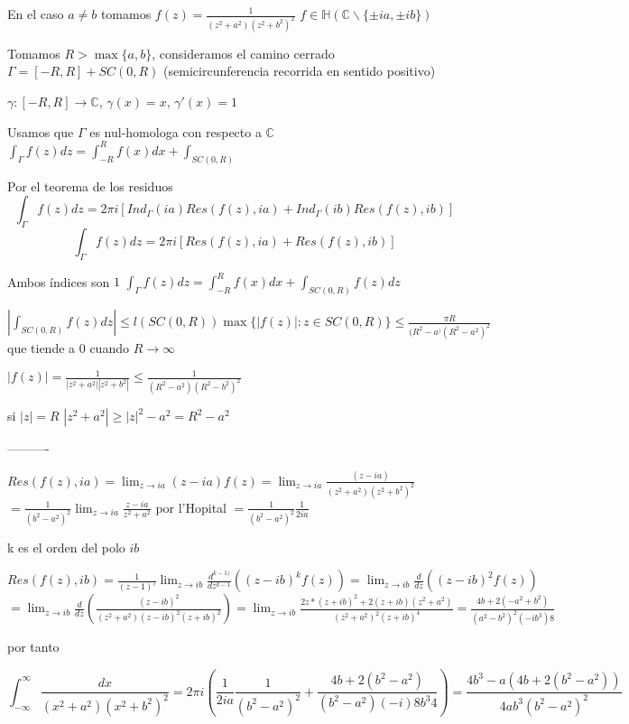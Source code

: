 
En el caso $a\not = b$ tomamos $f(z) = \frac{1}{(z^2+a^2)(z^2+b^2)^2}$
$f\in\mathbb{H}( \mathbb{C}\backslash\{ \pm ia, \pm ib \} )$

Tomamos $R>\max\{a,b\}$, consideramos el camino cerrado $\Gamma = [-R,R]+SC(0,R)$ (semicircunferencia recorrida en sentido positivo)

$\gamma : [-R,R]\rightarrow \mathbb{C}$, $\gamma(x)=x$, $\gamma '(x) = 1$

Usamos que $\Gamma$ es nul-homologa con respecto a $\mathbb{C}$
$\int_{\Gamma}f(z)dz = \int_{-R}^{R} f(x)dx + \int_{SC(0,R)}$

Por el teorema de los residuos 
$$\int_{\Gamma}f(z)dz = 2\pi i [ Ind_{\Gamma}(ia)Res(f(z),ia) + Ind_{\Gamma}(ib)Res(f(z),ib) ]$$
$$\int_{\Gamma}f(z)dz = 2\pi i [Res(f(z),ia) + Res(f(z),ib) ]$$

Ambos índices son $1$
$\int_{\Gamma}f(z)dz = \int_{-R}^{R} f(x)dx + \int_{SC(0,R)} f(z)dz$


$|\int_{SC(0,R)} f(z)dz| \leq l(SC(0,R))\max \{ |f(z)| : z\in SC(0,R) \} \leq \frac{\pi R}{(R^2-a^)(R^2-a^2)^2}$
que tiende a $0$ cuando $R\rightarrow \infty$

$|f(z)| = \frac{1}{|z^2+a^2||z^2+b^2|} \leq \frac{1}{(R^2-a^2)(R^2-b^2)^2}$

si $|z|=R$
$|z^2+a^2| \geq |z|^2 -a^2 = R^2-a^2$

----------

$Res(f(z),ia) = \lim_{z\rightarrow ia} (z-ia)f(z) = \lim_{z\rightarrow ia} \frac{(z-ia)}{(z^2+a^2)(z^2+b^2)^2} $
$= \frac{1}{(b^2-a^2)^2} \lim_{z\rightarrow ia} \frac{z-ia}{z^2+a^2}$ 
por l'Hopital
$= \frac{1}{(b^2-a^2)^2}\frac{1}{2ia}$

k es el orden del polo $ib$

$Res(f(z),ib) = \frac{1}{(z-1)'} \lim_{z\rightarrow ib} \frac{d^{k-1)}}{dz^{k-1}} ((z-ib)^k f(z)) = \lim_{z\rightarrow ib} \frac{d}{dz} ((z-ib)^2 f(z)) $
$= \lim_{z\rightarrow ib} \frac{d}{dz} \left( \frac{(z-ib)^2}{(z^2+a^2)(z-ib)^2(z+ib)^2}  \right) 
= \lim_{z\rightarrow ib}\frac{2z*(z+ib)^2 + 2(z+ib)(z^2+a^2)}{(z^2+a^2)^2 (z+ib)^4}
= \frac{4b + 2(-a^2+b^2)}{(a^2-b^2)^2 (-ib^3)8}  $

por tanto

$$ \int_{-\infty}^{\infty} \frac{dx}{(x^2+a^2)(x^2+b^2)^2} = 
2\pi i \left( \frac{1}{2ia}\frac{1}{(b^2-a^2)^2} + \frac{4b+2(b^2-a^2)}{(b^2-a^2)(-i)8b^3 4} \right) =
\frac{4b^3-a(4b+2(b^2-a^2))}{4ab^3(b^2-a^2)^2}$$

